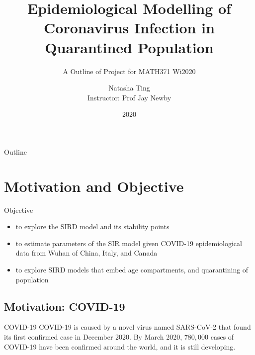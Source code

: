 \documentclass{beamer}
\title[Implicit Preferences] %
{Epidemiological Modelling of Coronavirus Infection in Quarantined Population}
\subtitle
{A Outline of Project for MATH371 Wi2020}
\author[natasha]{Natasha Ting\\[5mm]{\footnotesize Instructor: Prof Jay Newby}}
\institute[University of Alberta] %
{
  \inst{}%
  Department of Mathematical and Statistical Sciences\\
  University of Alberta
 }
\date{2020}
\begin{document}
\begin{frame}
  \titlepage
\end{frame}

\begin{frame}{Outline}
  \tableofcontents
\end{frame}


\section{Motivation and Objective}

\begin{frame}{Objective}
	\begin{itemize}
	\item to explore the SIRD model and its stability points
	\item to estimate parameters of the SIR model given COVID-19 epidemiological data from Wuhan of China, Italy, and Canada
	\item to explore SIRD models that embed age compartments, and quarantining of population
	\end{itemize}
\end{frame}

\subsection{Motivation: COVID-19}
\begin{frame}{COVID-19}
	COVID-19 is caused by a novel virus named SARS-CoV-2 that found its first confirmed case in December 2020. By March 2020, $780,000$ cases of COVID-19 have been confirmed around the world, and it is still developing. \\
\end{frame}





\end{document}

